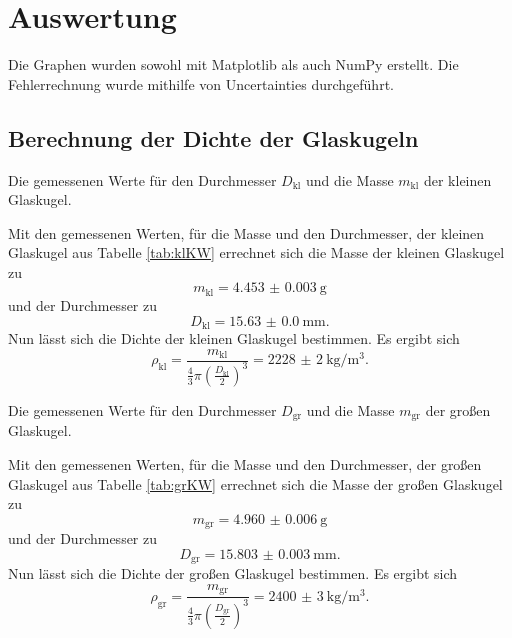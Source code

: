 \section{Auswertung}
\label{sec:Auswertung}

Die Graphen wurden sowohl mit Matplotlib \cite{matplotlib} als auch NumPy \cite{numpy} erstellt. Die
 Fehlerrechnung wurde mithilfe von Uncertainties \cite{uncertainties} durchgeführt.


\subsection{Berechnung der Dichte der Glaskugeln}
\begin{table}
	\centering
	\caption{Die gemessenen Werte für den Durchmesser $D_\text{kl}$ und die Masse $m_\text{kl}$ der kleinen Glaskugel.}
	
\end{table}
Mit den gemessenen Werten, für die Masse und den Durchmesser, der kleinen Glaskugel aus Tabelle \ref{tab:klKW} errechnet sich die Masse der kleinen Glaskugel zu
\begin{displaymath}
	m_\text{kl} = \SI{4.453(3)}{\gram}
\end{displaymath}
und der Durchmesser zu
\begin{displaymath}
	D_\text{kl} = \SI{15.63(0)}{\milli\meter}\text{.}
\end{displaymath}
Nun lässt sich die Dichte der kleinen Glaskugel bestimmen. Es ergibt sich
\begin{displaymath}
	\rho_\text{kl} = \frac{m_\text{kl}}{\frac{4}{3}\pi \left(\frac{D_\text{kl}}{2}\right)^3} = \SI{2228(2)}{\kilo\gram\per\meter\tothe{3}}\text{.}
\end{displaymath}
\begin{table}
	\centering
	\caption{Die gemessenen Werte für den Durchmesser $D_\text{gr}$ und die Masse $m_\text{gr}$ der großen Glaskugel.}
	
\end{table}
Mit den gemessenen Werten, für die Masse und den Durchmesser, der großen Glaskugel aus Tabelle \ref{tab:grKW} errechnet sich die Masse der großen Glaskugel zu
\begin{displaymath}
m_\text{gr} = \SI{4.960(6)}{\gram}
\end{displaymath}
und der Durchmesser zu
\begin{displaymath}
D_\text{gr} = \SI{15.803(3)}{\milli\meter}\text{.}
\end{displaymath}
Nun lässt sich die Dichte der großen Glaskugel bestimmen. Es ergibt sich
\begin{displaymath}
\rho_\text{gr} = \frac{m_\text{gr}}{\frac{4}{3}\pi \left(\frac{D_\text{gr}}{2}\right)^3} = \SI{2400(3)}{\kilo\gram\per\meter\tothe{3}}\text{.}
\end{displaymath}



